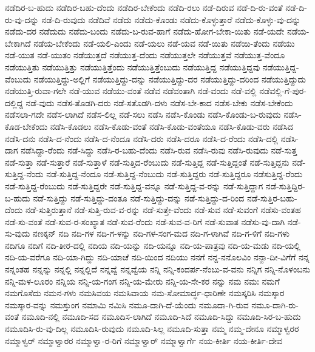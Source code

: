 ನಡೆದಿರ-ಬ-ಹುದು
ನಡೆದಿರ-ಬಹು-ದೆಂದು
ನಡೆದಿರ-ಬೇಕೆಂದು
ನಡೆದಿ-ರಲು
ನಡೆ-ದಿರುವ
ನಡೆ-ದಿ-ರು-ವಂತೆ
ನಡೆ-ದಿ-ರು-ವು-ದನ್ನು
ನಡೆ-ದಿ-ರುವುದು
ನಡೆದಿವೆ
ನಡೆದು
ನಡೆದು-ಕೊಂಡು
ನಡೆದು-ಕೊಳ್ಳುತ್ತಾರೆ
ನಡೆದು-ಕೊಳ್ಳು-ವು-ದನ್ನು
ನಡೆದು-ದರ
ನಡೆದುದು
ನಡೆದು-ಬಂದು
ನಡೆದು-ಬ-ರುವ-ಹಾಗೆ
ನಡೆದು-ಹೋಗ-ಬೇಕಾ-ಯಿತು
ನಡೆ-ಯದೇ
ನಡೆಯ-ಬೇಕಾಗಿದೆ
ನಡೆಯ-ಬೇಕೆಂದು
ನಡೆ-ಯಲಿ-ಎಂದು
ನಡೆ-ಯಲು
ನಡೆ-ಯವ
ನಡೆ-ಯಿತು
ನಡೆಯಿ-ತೆಂದು
ನಡೆಯು
ನಡೆ-ಯುತ
ನಡೆ-ಯುತಂ
ನಡೆಯುತ್ತದೆ
ನಡೆಯುತ್ತ-ದೆಂದು
ನಡೆಯುತ್ತಲೇ
ನಡೆಯುತ್ತವೆ
ನಡೆಯುತ್ತ-ವೆಂದೂ
ನಡೆಯುತ್ತಿತು
ನಡೆಯುತ್ತಿತ್ತು
ನಡೆಯುತ್ತಿತ್ತೆಂದು
ನಡೆಯುತ್ತಿತ್ತೆಂಬುದು
ನಡೆಯುತ್ತಿದ್ದ
ನಡೆಯುತ್ತಿದ್ದವು
ನಡೆಯುತ್ತಿದ್ದ-ವೆಂಬುದು
ನಡೆಯುತ್ತಿದ್ದು-ಅಲ್ಲಿಗೆ
ನಡೆಯುತ್ತಿದ್ದು-ದನ್ನು
ನಡೆಯುತ್ತಿದ್ದು-ದರ
ನಡೆಯುತ್ತಿದ್ದು-ದರಿಂದ
ನಡೆಯುತ್ತಿದ್ದುದು
ನಡೆಯುತ್ತಿ-ರುವಾ-ಗಲೇ
ನಡೆ-ಯುವ
ನಡೆಯು-ವಂತೆ
ನಡೆವ
ನಡೆವಂತಾಗಿ
ನಡೆ-ವಂದು
ನಡೆ-ವಲ್ಲಿ
ನಡೆವಲ್ಲಿ-ಗೆ-ಪುರ-ದಲ್ಲಿದ್ದ
ನಡೆ-ವುದು
ನಡೆಸ-ತೊಡಗಿ-ದರು
ನಡೆ-ಸತೊಡಗಿ-ದಳು
ನಡೆಸ-ಬೇ-ಕಾದ
ನಡೆಸ-ಬೇಕು
ನಡೆಸ-ಬೇಕೆಂದು
ನಡೆಸಲಾ-ಗದೇ
ನಡೆಸ-ಲಾಗಿದೆ
ನಡೆಸ-ಲಿಲ್ಲ
ನಡೆ-ಸಲು
ನಡೆಸಿ
ನಡೆಸಿ-ಕೊಂಡು
ನಡೆಸಿ-ಕೊಂಡು-ಬ-ರುವುದು
ನಡೆಸಿ-ಕೊಡ-ಬೇಕೆಂದು
ನಡೆಸಿ-ಕೊಡಲು
ನಡೆಸಿ-ಕೊಡು-ವಂತೆ
ನಡೆಸಿ-ಕೊಡು-ವಂತೆಯೂ
ನಡೆಸಿ-ಕೊಡು-ವರು
ನಡೆಸಿದ
ನಡೆಸಿ-ದನು
ನಡೆಸಿ-ದ-ನೆಂದು
ನಡೆಸಿ-ದ-ನೆಂದೂ
ನಡೆಸಿ-ದರು
ನಡೆಸಿ-ದರೂ
ನಡೆಸಿ-ದ-ರೆಂದು
ನಡೆಸಿ-ದಲ್ಲಿ
ನಡೆಸಿ-ದಾಗ
ನಡೆಸಿದ್ದಾ-ರೆಂದು
ನಡೆ-ಸಿದ್ದು
ನಡೆಸಿ-ರ-ಬಹು-ದೆಂದು
ನಡೆಸಿ-ರುವ
ನಡೆಸಿ-ರುವು
ನಡೆಸಿ-ರುವುದು
ನಡೆ-ಸುತ್ತ
ನಡೆ-ಸುತ್ತಾ
ನಡೆ-ಸುತ್ತಾರೆ
ನಡೆ-ಸುತ್ತಾಳೆ
ನಡೆ-ಸುತ್ತಿದ-ರೆಂಬುದು
ನಡೆ-ಸುತ್ತಿದ್ದ
ನಡೆ-ಸುತ್ತಿದ್ದಂತೆ
ನಡೆ-ಸುತ್ತಿದ್ದನು
ನಡೆ-ಸುತ್ತಿದ್ದ-ನೆಂದು
ನಡೆ-ಸುತ್ತಿದ್ದ-ನೆಂದೂ
ನಡೆ-ಸುತ್ತಿದ್ದ-ನೆಂಬುದು
ನಡೆ-ಸುತ್ತಿದ್ದರು
ನಡೆ-ಸುತ್ತಿದ್ದರೂ
ನಡೆಸುತ್ತಿದ್ದ-ರೆಂದು
ನಡೆ-ಸುತ್ತಿದ್ದ-ರೆಂಬುದು
ನಡೆ-ಸುತ್ತಿದ್ದರೇ
ನಡೆ-ಸುತ್ತಿದ್ದ-ವನ್ನೂ
ನಡೆ-ಸುತ್ತಿದ್ದ-ವ-ರನ್ನು
ನಡೆ-ಸುತ್ತಿದ್ದಾಗ
ನಡೆ-ಸುತ್ತಿದ್ದಿರ-ಬ-ಹುದು
ನಡೆ-ಸುತ್ತಿದ್ದು
ನಡೆ-ಸುತ್ತಿದ್ದು-ದಂತೂ
ನಡೆ-ಸುತ್ತಿದ್ದು-ದನ್ನು
ನಡೆ-ಸುತ್ತಿದ್ದು-ದ-ರಿಂದ
ನಡೆ-ಸುತ್ತಿರ-ಬಹು-ದೆಂದು
ನಡೆ-ಸುತ್ತಿರುತ್ತಾನೆ
ನಡೆ-ಸುತ್ತಿ-ರುವ-ವ-ರನ್ನು
ನಡೆ-ಸುತ್ತೇ-ವೆಂದು
ನಡೆ-ಸುವ
ನಡೆ-ಸುವಂಗೆ
ನಡೆಸು-ವಂತಹ
ನಡೆ-ಸು-ವಂತೆ
ನಡೆ-ಸುವ-ರ-ಸಂಖ್ಯಾತ
ನಡೆ-ಸುವ-ರೆಂದು
ನಡೆ-ಸುವ-ವ-ರಿಗೆ
ನಡೆ-ಸುವಾತ
ನಡೆಸು-ವು-ದಾಗಿ
ನಡೆ-ಸು-ವುದು
ನಣಕ್ಕನ್
ನದಿ
ನದಿ-ಗಳ
ನದಿ-ಗ-ಳನ್ನು
ನದಿ-ಗಳ-ಸಂಗ-ಮದ
ನದಿ-ಗ-ಳಾಗಿವೆ
ನದಿ-ಗ-ಳಿಗೆ
ನದಿ-ಗಳು
ನದಿಗೂ
ನದಿಗೆ
ನದಿ-ತೀರ-ದಲ್ಲಿ
ನದಿಯ
ನದಿ-ಯನ್ನು
ನದಿ-ಯನ್ನೂ
ನದಿ-ಯ-ಪಾತ್ರವು
ನದಿ-ಯ-ಮಡು
ನದಿ-ಯಲ್ಲಿ
ನದಿ-ಯ-ವರೆಗೂ
ನದಿ-ಯಾ-ಗಿದ್ದು
ನದಿ-ಯಾಚೆ
ನದಿ-ಯಿಂದ
ನದಿಯು
ನನಗೆ
ನನ್ದ-ನನೊಲವಿಂ
ನನ್ದಾ-ದೀ-ವಿಗೆಗೆ
ನನ್ನ
ನನ್ನಂತಹ
ನನ್ನನ್ನು
ನನ್ನಲ್ಲಿ
ನನ್ನಲ್ಲಿದೆ
ನನ್ನವ್ವೆ
ನನ್ನವ್ವೆಯ
ನನ್ನಿ
ನನ್ನಿ-ಕಂದರ್ಪ-ನೆಂಬು-ವ-ವನು
ನನ್ನಿಗ
ನನ್ನಿ-ನೊಳಂಬನು
ನನ್ನಿ-ಮಳ-ಲೂರಂ
ನನ್ನಿಯ
ನನ್ನಿ-ಯ-ಗಂಗ
ನನ್ನಿ-ಯ-ಮೇರು
ನನ್ನಿ-ಯ-ಸೇ-ಕರ
ನನ್ನು
ನಮ
ನಮಃ
ನಮಗೆ
ನಮಗೊಸೆದು
ನಮನ-ಗಳು
ನಮಸಿವಯ
ನಮಸಿವಾಯ
ನಮ-ಸೋಮಾರ್ದ್ಧ-ಧಾರಿಣೇ
ನಮಸ್ಕರಿಸಿ
ನಮಸ್ಕಾರ
ನಮಸ್ಕಾರ-ವನ್ನು
ನಮಸ್ತುಂಗ
ನಮಾಮಿ
ನಮಿಸಿ
ನಮೂ-ದಾಗಿ-ದೆ-ಯೆಂದು
ನಮೂದಾ-ಗಿ-ರುವ
ನಮೂ-ದಾಗಿ-ರು-ವಂತೆ
ನಮೂದಿ-ನಲ್ಲಿ
ನಮೂದಿ-ಸದ
ನಮೂದಿಸ-ಲಾಗಿದೆ
ನಮೂದಿ-ಸಿದೆ
ನಮೂದಿ-ಸಿದ್ದು
ನಮೂದಿ-ಸಿರ-ಬ-ಹುದು
ನಮೂದಿಸಿ-ರು-ವು-ದಿಲ್ಲ
ನಮೂದಿಸಿ-ರುವುದು
ನಮೂದಿ-ಸಿಲ್ಲ
ನಮೂದಿ-ಸುತ್ತಾ
ನಮ್ಮ
ನಮ್ಮ-ದೇನೂ
ನಮ್ಮಾಳ್ವರರ
ನಮ್ಮಾಳ್ವರ್
ನಮ್ಮಾಳ್ವಾರರ
ನಮ್ಮಾಳ್ವಾ-ರ-ರಿಗೆ
ನಮ್ಮಾಳ್ವಾರ್
ನಮ್ಮಾಳ್ವಾರ್ಗೆ
ನಯ-ಕೀರ್ತಿ
ನಯ-ಕೀರ್ತಿ-ದೇವ
